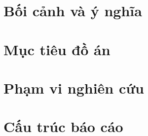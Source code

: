 \section{Bối cảnh và ý nghĩa}

\section{Mục tiêu đồ án}

\section{Phạm vi nghiên cứu}

\section{Cấu trúc báo cáo}
